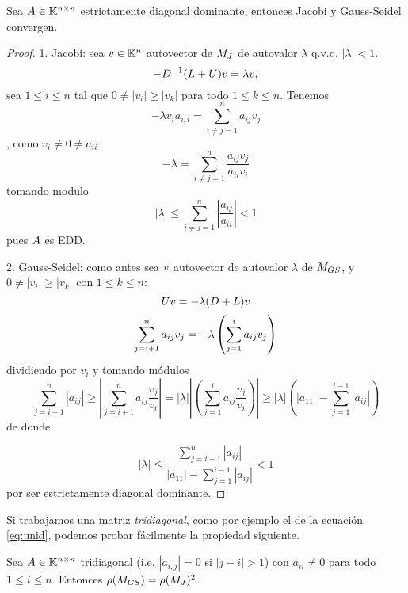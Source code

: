 \tcc
\begin{proposicion}
Sea $\Ab\in \Knn$ estrictamente diagonal dominante, entonces Jacobi y Gauss-Seidel convergen.
\end{proposicion}
\etcc
\begin{proof}
1. Jacobi: sea $\vb\in \Kn$ autovector de $\Mb_J$ de autovalor $\lambda$ q.v.q. $|\lambda|<1$.
$$
-D^{-1}(L+U)\vb=\lambda\vb,
$$
sea $1\le i\le n$ tal que
$0\neq |v_i|\ge |v_k|$ para todo $1\le k\le n$. Tenemos
$$
-\lambda v_ia_{i,i}=\sum_{i\neq j=1}^n a_{ij}v_j
$$, como $v_i\neq 0\neq a_{ii}$
$$
-\lambda=\sum_{i\neq j=1}^n \frac{a_{ij}v_j}{a_{ii}v_i}
$$
tomando modulo
$$
|\lambda|\le \sum_{i\neq j=1}^n |\frac{a_{ij}}{a_{ii}}|<1
$$
pues $\Ab$ es EDD.

2. Gauss-Seidel: como antes sea $\vb$ autovector de autovalor $\lambda$ de $\Mb_{GS}$, y $0\neq|v_i|\ge |v_k|$ con $1\le k\le n$:
$$
\Ub\vb=-\lambda(\Db+\Lb)\vb
$$
$$
\sum_{j=i+1}^na_{ij}\vb_j=-\lambda\left(
\sum_{j=1}^{i}a_{ij}\vb_j\right)
$$
dividiendo por $v_i$ y tomando módulos
$$
\sum_{j=i+1}^n|a_{ij}|
\ge \left|\sum_{j=i+1}^na_{ij}\frac{v_j}{v_i}\right|=|\lambda|\left|\left(
\sum_{j=1}^{i}a_{ij}\frac{v_j}{v_i}\right)\right|\ge |\lambda| \left(|a_{11}|-
\sum_{j=1}^{i-1}|a_{ij}|\right)
$$
de donde

$$
|\lambda|\le
\frac{\sum_{j=i+1}^n|a_{ij}|}{|a_{11}|-
\sum_{j=1}^{i-1}|a_{ij}|}
<1
$$
por ser estrictamente diagonal dominante.
\end{proof}
Si trabajamos una matriz \emph{tridiagonal}, como por ejemplo el de la ecuación \eqref{eq:unid},  podemos probar fácilmente la propiedad siguiente.
 \begin{proposicion}
\label{prop:mat_trid_gs_j}
Sea $\Ab\in \Knn$ tridiagonal (i.e. $|a_{i,j}|=0$ si $|j-i|>1$) con $a_{ii}\neq 0$ para todo $1\le i\le n$.  Entonces
$\rho(\Mb_{GS})=\rho(\Mb_{J})^2$.
\end{proposicion}
